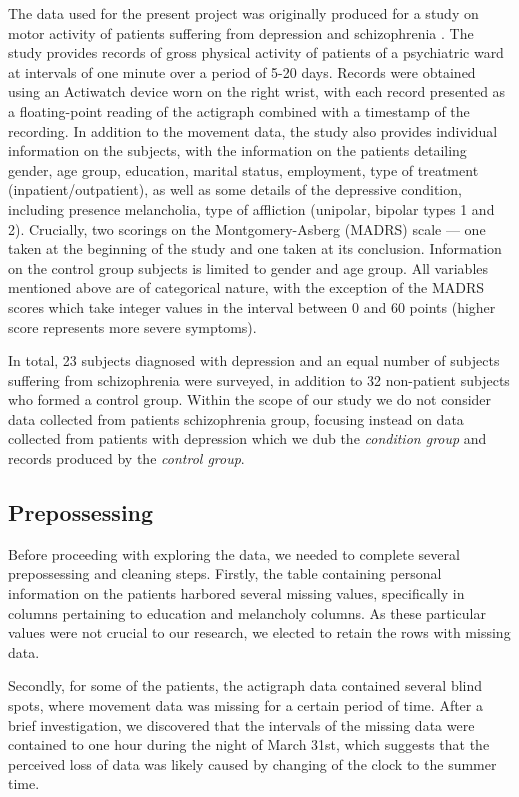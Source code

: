 \documentclass[12pt]{article}
\begin{document}
The data used for the present project was originally produced for a study on motor activity of patients suffering from depression and schizophrenia \parencite{Berle_2010}. The study provides records of gross physical activity of patients of a psychiatric ward at intervals of one minute over a period of 5-20 days. Records were obtained using an Actiwatch device worn on the right wrist, with each record presented as a floating-point reading of the actigraph combined with a timestamp of the recording. In addition to the movement data, the study also provides individual information on the subjects, with the information on the patients detailing gender, age group, education, marital status, employment, type of treatment (inpatient/outpatient), as well as some details of the depressive condition, including presence melancholia, type of affliction (unipolar, bipolar types 1 and 2). Crucially, two scorings on the Montgomery-Asberg (MADRS) scale \parencite{Montgomery_Asberg_1979} — one taken at the beginning of the study and one taken at its conclusion. Information on the control group subjects is limited to gender and age group. All variables mentioned above are of categorical nature, with the exception of the MADRS scores which take integer values in the interval between 0 and 60 points (higher score represents more severe symptoms).

In total, 23 subjects diagnosed with depression and an equal number of subjects suffering from schizophrenia were surveyed, in addition to 32 non-patient subjects who formed a control group. Within the scope of our study we do not consider data collected from patients schizophrenia group, focusing instead on data collected from patients with depression which we dub the \textit{condition group} and records produced by the \textit{control group}.

\subsection{Prepossessing}

Before proceeding with exploring the data, we needed to complete several prepossessing and cleaning steps. Firstly, the table containing personal information on the patients harbored several missing values, specifically in columns pertaining to education and melancholy columns. As these particular values were not crucial to our research, we elected to retain the rows with missing data.

Secondly, for some of the patients, the actigraph data contained several blind spots, where movement data was missing for a certain period of time. After a brief investigation, we discovered that the intervals of the missing data were contained to one hour during the night of March 31st, which suggests that the perceived loss of data was likely caused by changing of the clock to the summer time.
\end{document}
